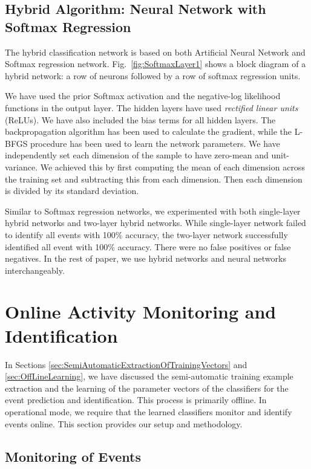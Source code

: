 \documentclass[]{IEEEtran}
\begin{document}
\subsection{Hybrid Algorithm: Neural Network with Softmax Regression}
\label{sec:HybridAlgorithmNeuralNetworkAndSoftmaxRegreation}

The hybrid classification network is based on both Artificial Neural Network  and Softmax regression network. Fig.~\ref{fig:SoftmaxLayer1} shows a block diagram of a hybrid network: a row of neurons followed by a row of softmax regression units.
\par
We have used the prior Softmax activation  and the negative-log likelihood 
functions in the output layer. The hidden layers have used \emph{rectified linear units }(ReLUs). 
We have also included the bias terms for all hidden layers. The backpropagation algorithm\cite{Sarkar1995}
has been used to calculate the gradient, while the L-BFGS procedure has been used to 
learn the network parameters. We have independently set each dimension of the sample to 
have zero-mean and unit-variance. We achieved this by first computing the mean of each 
dimension across the training set and subtracting this from each dimension. Then each 
dimension is divided by its standard deviation.       

Similar to Softmax regression networks, we experimented  with both single-layer hybrid networks and two-layer hybrid networks. While single-layer network failed to identify all events with 100\% accuracy, the two-layer network successfully identified all event with 100\% accuracy. There were no false positives or false negatives. In the rest of paper, we use hybrid networks and neural networks interchangeably.

\section{Online Activity Monitoring and Identification}

In Sections \ref{sec:SemiAutomaticExtractionOfTrainingVectors} and 
\ref{sec:OffLineLearning}, we have discussed the semi-automatic training example 
extraction and the learning of the parameter vectors of the classifiers for the event 
prediction and identification. This process is primarily offline. In operational mode, we 
require that the learned classifiers monitor and identify events online. This section 
provides our setup and methodology.  



\subsection{Monitoring of Events}
\end{document}
